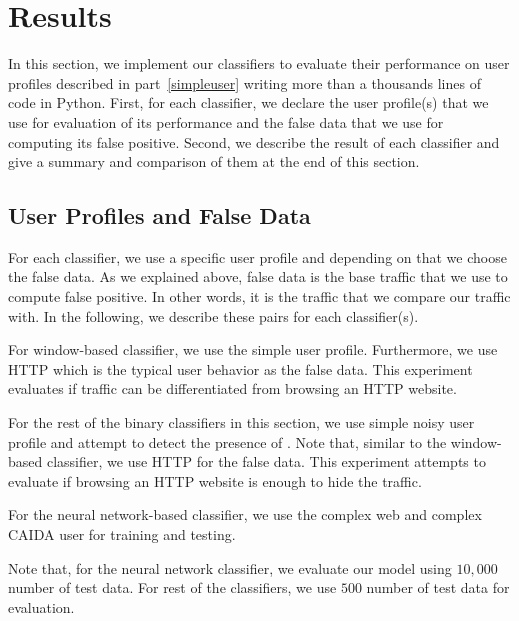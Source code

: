 \vspace{-0.2mm}
\section{Results}\label{sec:exp}
In this section, we implement our classifiers to evaluate their performance on user profiles described in part~\ref{simpleuser} writing more than a thousands lines of code in Python. First, for each classifier, we declare the user profile(s) that we use for evaluation of its performance and the false data that we use for computing its false positive. Second, we describe the result of each classifier and give a summary and comparison of them at the end of this section.

\subsection{User Profiles and False Data}

For each classifier, we use a specific user profile and depending on that we choose the false data. As we explained above,  false data is the base traffic that we use to compute false positive. In other words, it is the traffic that we compare our \bc traffic with. In the following, we describe these pairs for each classifier(s). 
\begin{compactitem}

\item For window-based classifier, we use the simple user profile. Furthermore, we use HTTP which is the typical user behavior as the false data. This experiment evaluates if \bc traffic can be differentiated from browsing an HTTP website. 
\item  For the rest of the binary classifiers in this section, we use simple noisy user profile and attempt to detect the presence of \bc. Note that, similar to the window-based classifier, we use HTTP for the false data. This experiment attempts to evaluate if browsing an HTTP website is enough to hide the \bc traffic. 
\item For the neural network-based classifier, we use the complex web and complex CAIDA user for training and testing.
\end{compactitem}
Note that, for the neural network classifier, we evaluate our model using $10,000$ number of test data. For rest of the classifiers, we use $500$ number of test data for evaluation.


